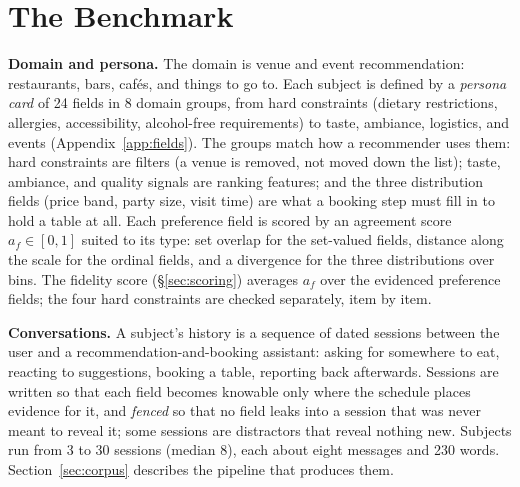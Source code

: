 \documentclass{article}
\begin{document}
\section{The Benchmark}
\label{sec:bench}

\textbf{Domain and persona.} The domain is venue and event recommendation: restaurants, bars,
caf\'es, and things to go to. Each subject is defined by a \emph{persona card} of 24 fields in 8
domain groups, from hard constraints (dietary restrictions, allergies, accessibility, alcohol-free
requirements) to taste, ambiance, logistics, and events (Appendix~\ref{app:fields}). The groups match how a recommender uses them:
hard constraints are filters (a venue is removed, not moved down the list); taste, ambiance,
and quality signals are ranking features; and the three distribution fields (price band, party
size, visit time) are what a booking step must fill in to hold a table at all. Each preference field is scored
by an agreement score $a_f\in[0,1]$ suited to its type: set overlap for the set-valued fields,
distance along the scale for the ordinal fields, and a
divergence for the three distributions over bins. The fidelity score (\S\ref{sec:scoring})
averages $a_f$ over the evidenced preference fields; the four hard constraints are checked
separately, item by item.

\textbf{Conversations.} A subject's history is a sequence of dated sessions between the user and a
recommendation-and-booking assistant: asking for somewhere to eat, reacting to suggestions,
booking a table, reporting back afterwards. Sessions are written so that each field becomes
knowable only where the schedule places evidence for it, and \emph{fenced} so that no field leaks
into a session that was never meant to reveal it; some sessions are distractors that reveal nothing
new. Subjects run from 3 to 30 sessions (median 8), each about eight messages and 230 words.
Section~\ref{sec:corpus} describes the pipeline that produces them.
\end{document}
